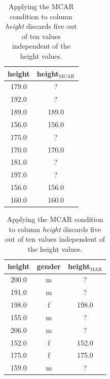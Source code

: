 \documentclass[utf8]{frontiersSCNS} %
\begin{document}
\begin{table}
	\centering
	\begin{minipage}{0.28\textwidth}
		\centering
		\begin{tabular}{cc}
			\toprule
			height &  height$_{\text{MCAR}}$ \\
			\midrule
			179.0 &                     ? \\
			192.0 &                     ? \\
			189.0 &                 189.0 \\
			156.0 &                 156.0 \\
			175.0 &                     ? \\
			170.0 &                 170.0 \\
			181.0 &                     ? \\
			197.0 &                     ? \\
			156.0 &                 156.0 \\
			160.0 &                 160.0 \\
			\bottomrule
		\end{tabular}
		\caption{
			Applying the MCAR condition to column \textit{height} discards five out of ten values independent of the height values.
		}
		\label{tab:missingness_patterns_MCAR}
		\vspace{2em}
	\end{minipage}
	\hfill
	\begin{minipage}{0.3\textwidth}
		\centering
		\begin{tabular}{ccc}
			\toprule
			height & gender &  height$_{\text{MAR}}$ \\
			\midrule
			200.0 &      m &                    ? \\
			191.0 &      m &                    ? \\
			198.0 &      f &                198.0 \\
			155.0 &      m &                    ? \\
			206.0 &      m &                    ? \\
			152.0 &      f &                152.0 \\
			175.0 &      f &                175.0 \\
			159.0 &      m &                    ? \\

\end{tabular}
\end{minipage}
\end{table}
\end{document}
